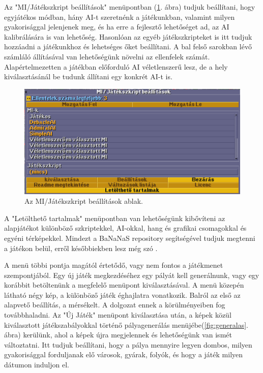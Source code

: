 Az "MI/Játékszkript beállítások" menüpontban (\ref{fig:mibeall}. ábra) tudjuk beállítani, hogy egyjátékos módban, hány AI-t szeretnénk a játékunkban, valamint milyen gyakorisággal jelenjenek meg, és ha erre a fejlesztő lehetőséget ad, az AI kalibrálására is van lehetőség. Hasonlóan az egyéb játékszkripteket is itt tudjuk hozzáadni a játékunkhoz és lehetséges őket beállítani. A bal felső sarokban lévő számláló állításával van lehetőségünk növelni az ellenfelek számát. Alapértelmezetten a játékban előforduló AI véletlenszerű lesz, de a hely kiválasztásánál be tudunk állítani egy konkrét AI-t is.

\begin{figure}[h!]
	\centering
	\includegraphics[scale=0.6]{images/mibeall.png}
	\caption{Az MI/Játékszkript beállítások ablak.}
	\label{fig:mibeall}
\end{figure}

A "Letölthető tartalmak" menüpontban van lehetőségünk kibővíteni az alapjátékot különböző szkriptekkel, AI-okkal, hang és grafikai csomagokkal és egyéni térképekkel. Mindezt a BaNaNaS repository segítségével tudjuk megtenni a játékon belül, erről későbbiekben lesz még szó \cite{openttdbananas}. 

A menü többi pontja magától értetődő, vagy nem fontos a játékmenet szempontjából. Egy új játék megkezdéséhez egy pályát kell generálnunk, vagy egy korábbit betöltenünk a megfelelő menüpont kiválasztásával. A menü közepén látható négy kép, a különböző játék éghajlatra vonatkozik. Balról az első az alapvető beállítás, a mérsékelt. A dolgozat ennek a körülményeiben fog továbbhaladni. Az "Új Játék" menüpont kiválasztása után, a képek közül kiválasztott játékszabályokkal történő pályagenerálás menüjébe(\ref{fig:generalas}. ábra) kerülünk, ahol a képek újra megjelennek és lehetőségünk van ismét változtatni. Itt tudjuk beállítani, hogy a pálya mennyire legyen dombos, milyen gyakorisággal forduljanak elő városok, gyárak, folyók, és hogy a játék milyen dátumon induljon el.

